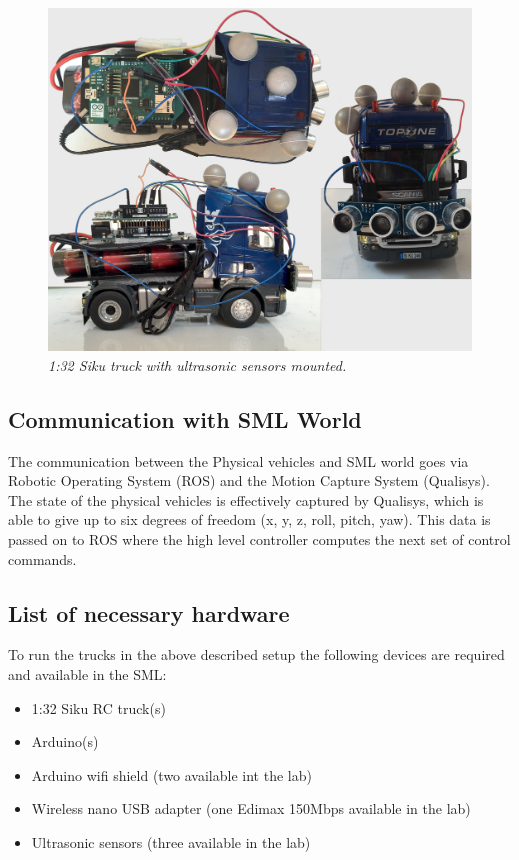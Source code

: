 \documentclass[11pt,a4paper]{book}
\begin{document}
\begin{figure}[!ht]

  \centering
    \includegraphics[width=\textwidth]{truck.png}
  \caption{\textit{1:32 Siku truck with ultrasonic sensors mounted.}}
\label{fig:ultrasonic}
\end{figure}

\subsection{Communication with SML World}
The communication between the Physical vehicles and SML world goes via Robotic Operating System (ROS) and the Motion Capture System (Qualisys). \\

\noindent The state of the physical vehicles is effectively captured by Qualisys, which is able to give up to six degrees of freedom (x, y, z, roll, pitch, yaw). This data is passed on to ROS where the high level controller computes the next set of control commands.

\subsection{List of necessary hardware}
To run the trucks in the above described setup the following devices are required and available in the SML:
\begin{itemize}
\item 1:32 Siku RC truck(s)
\item Arduino(s)
\item Arduino wifi shield (two available int the lab)
\item Wireless nano USB adapter (one Edimax 150Mbps available in the lab)
\item Ultrasonic sensors (three available in the lab)
\end{itemize}
\end{document}
